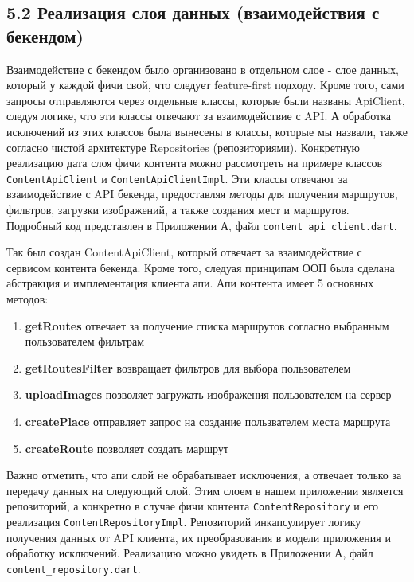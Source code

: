 \subsection*{5.2 Реализация слоя данных (взаимодействия с бекендом)}
Взаимодействие с бекендом было организовано в отдельном слое - слое данных, который у каждой фичи свой, что следует feature-first подходу. Кроме того, сами запросы отправляются через отдельные классы, которые были названы ApiClient, следуя логике, что эти классы отвечают за взаимодействие с API. А обработка исключений из этих классов была вынесены в классы, которые мы назвали, также согласно чистой архитектуре Repositories (репозиториями). Конкретную реализацию дата слоя фичи контента можно рассмотреть на примере классов \texttt{ContentApiClient} и \texttt{ContentApiClientImpl}. Эти классы отвечают за взаимодействие с API бекенда, предоставляя методы для получения маршрутов, фильтров, загрузки изображений, а также создания мест и маршрутов. Подробный код представлен в Приложении А, файл \texttt{content\_api\_client.dart}.

Так был создан ContentApiClient, который отвечает за взаимодействие с сервисом контента бекенда. Кроме того, следуая принципам ООП была сделана абстракция и имплементация клиента апи. Апи контента имеет 5 основных методов:

\begin{enumerate}
    \item \textbf{getRoutes} отвечает за получение списка маршрутов согласно выбранным пользователем фильтрам
    \item \textbf{getRoutesFilter} возвращает фильтров для выбора пользователем
    \item \textbf{uploadImages} позволяет загружать изображения пользователем на сервер
    \item \textbf{createPlace} отправляет запрос на создание пользвателем места маршрута
    \item \textbf{createRoute} позволяет создать маршрут
\end{enumerate}

\noindent Важно отметить, что апи слой не обрабатывает исключения, а отвечает только за передачу данных на следующий слой. Этим слоем в нашем приложении является репозиторий, а конкретно в случае фичи контента \texttt{ContentRepository} и его реализация \texttt{ContentRepositoryImpl}. Репозиторий инкапсулирует логику получения данных от API клиента, их преобразования в модели приложения и обработку исключений. Реализацию можно увидеть в Приложении А, файл \texttt{content\_repository.dart}.

